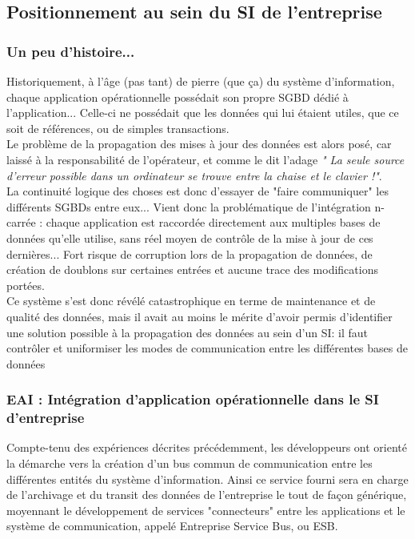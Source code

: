 \subsection{Positionnement au sein du SI de l'entreprise}

\subsubsection{ Un peu d'histoire...}

Historiquement, à l'âge (pas tant) de pierre (que ça) du système d'information, chaque application opérationnelle possédait son propre SGBD dédié à l'application... Celle-ci ne possédait que les données qui lui étaient utiles, que ce soit de références, ou de simples transactions.\\
Le problème de la propagation des mises à jour des données est alors posé, car laissé à la responsabilité de l'opérateur, et comme le dit l'adage \textit{" La seule source d'erreur possible dans un ordinateur se trouve entre la chaise et le clavier !"}.\\
La continuité logique des choses est donc d'essayer de "faire communiquer" les différents SGBDs entre eux... Vient donc la problématique de l'intégration n-carrée : chaque application est raccordée directement aux multiples bases de données qu'elle utilise, sans réel moyen de contrôle de la mise à jour de ces dernières... Fort risque de corruption lors de la propagation de données, de création de doublons sur certaines entrées et aucune trace des modifications portées. \\
Ce système s'est donc révélé catastrophique en terme de maintenance et de qualité des données, mais il avait au moins le mérite d'avoir permis d'identifier une solution possible à la propagation des données au sein d'un SI: il faut contrôler et uniformiser les modes de communication entre les différentes bases de données\\

\subsubsection{ EAI : Intégration d'application opérationnelle dans le SI d'entreprise}

Compte-tenu des expériences décrites précédemment, les développeurs ont orienté la démarche vers la création d'un bus commun de communication entre les différentes  entités du système d'information. Ainsi ce service fourni sera en charge de l'archivage et du transit des données de l'entreprise le tout de façon générique, moyennant le développement de services "connecteurs" entre les applications et le système de communication, appelé Entreprise Service Bus, ou ESB.\\

